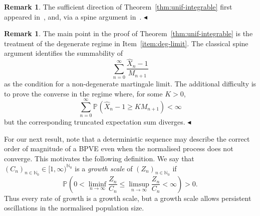\documentclass[12pt]{article}
\theoremstyle{definition}
\newtheorem{rmq}[thm]{Remark}
\newcommand{\Prob}[2][]{\ensuremath{\mathbb{P}_{#1} \left(#2 \right)}}
\newcommand{\ensymboldremark }{\hfill$\blacktriangleleft$}
\begin{document}
\begin{rmq}
    The sufficient direction of Theorem~\ref{thm:unif-integrable} first appeared in~\cite[Theorem 5]{goettge-suff}, and, via a spine argument in~\cite[Corollary~3.1]{measure-change}. {\small\ensymboldremark }
\end{rmq}

\begin{rmq} \label{rmq:novelty-unif}
The main point in the proof of Theorem~\ref{thm:unif-integrable} is the treatment of the degenerate regime in Item~\ref{item:deg-limit}. The classical spine argument identifies the summability of
\[
\sum_{n=0}^{\infty}\frac{\widehat X_n-1}{M_{n+1}}
\]
as the condition for a non-degenerate martingale limit. The additional difficulty is to prove the converse in the regime where, for some $K>0$,
\[
\sum_{n=0}^{\infty}
\Prob{\widehat X_n-1\geq K M_{n+1}}<\infty
\]
but the corresponding truncated expectation sum diverges. {\small\ensymboldremark }
\end{rmq}

For our next result, note that a deterministic sequence may describe the correct order of magnitude of a BPVE even when the normalised process does not converge. This motivates the following definition. We say that $(C_n)_{n\in\mathbb{N}_0}\in [1,\infty)^{\mathbb{N}_0}$ is a \emph{growth scale} of $(Z_n)_{n\in\mathbb{N}_0}$ if
\begin{equation}\label{eq:growth-scale-defn}
\Prob{
0<\liminf_{n\to\infty}\frac{Z_n}{C_n}
\leq
\limsup_{n\to\infty}\frac{Z_n}{C_n}
<\infty}>0.
\end{equation}
Thus every rate of growth is a growth scale, but a growth scale allows persistent oscillations in the normalised population size. 
\end{document}
